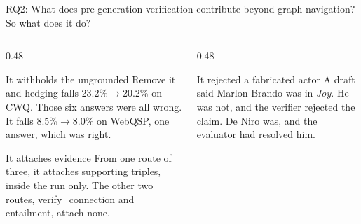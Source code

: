 {%
\begin{frame}{RQ2: What does pre-generation verification contribute beyond graph navigation?}{So what does it do?}
  \bodyshift{-3.25pt}
  \begin{columns}[T]
    \begin{column}{0.48\textwidth}
      \begin{block}{It withholds the ungrounded}
        \small\agrraggedright
        Remove it and hedging falls $23.2\% \to 20.2\%$ on CWQ. Those six
        answers were all wrong. It falls $8.5\% \to 8.0\%$ on WebQSP, one
        answer, which was right.
      \end{block}
      \vspace{0.5mm}
      \begin{block}{It attaches evidence}
        \small\agrraggedright
        From \alert{one route of three}, it attaches supporting triples,
        inside the run only. The other two routes,
        \mbox{\textsf{verify\_connection}} and entailment, attach none.
      \end{block}
    \end{column}
    \begin{column}{0.48\textwidth}
      \begin{block}{It rejected a fabricated actor}
        \small\agrraggedright
        A draft said Marlon Brando was in \emph{Joy}. He was not, and the
        verifier rejected the claim. De Niro was, and the evaluator had
        resolved him.
      \end{block}
    \end{column}
  \end{columns}
\end{frame}

}
